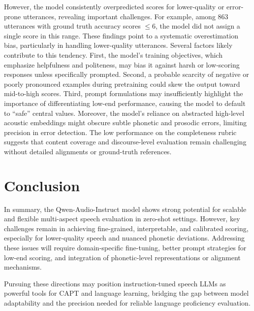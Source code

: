 \documentclass{Interspeech}
\begin{document}
However, the model consistently overpredicted scores for lower-quality or error-prone utterances, revealing important challenges. For example, among 863 utterances with ground truth accuracy scores  $\leq 6$, the model did not assign a single score in this range. These findings point to a systematic overestimation bias, particularly in handling lower-quality utterances. Several factors likely contribute to this tendency. First, the model’s training objectives, which emphasize helpfulness and politeness, may bias it against harsh or low-scoring responses unless specifically prompted. Second, a probable scarcity of negative or poorly pronounced examples during pretraining could skew the output toward mid-to-high scores. Third, prompt formulations may insufficiently highlight the importance of differentiating low-end performance, causing the model to default to “safe” central values. Moreover, the model’s reliance on abstracted high-level acoustic embeddings might obscure subtle phonetic and prosodic errors, limiting precision in error detection. The low performance on the completeness rubric suggests that content coverage and discourse-level evaluation remain challenging without detailed alignments or ground-truth references.

\section{Conclusion}

In summary, the Qwen-Audio-Instruct model shows strong potential for scalable and flexible multi-aspect speech evaluation in zero-shot settings. However, key challenges remain in achieving fine-grained, interpretable, and calibrated scoring, especially for lower-quality speech and nuanced phonetic deviations. Addressing these issues will require domain-specific fine-tuning, better prompt strategies for low-end scoring, and integration of phonetic-level representations or alignment mechanisms.

Pursuing these directions may position instruction-tuned speech LLMs as powerful tools for CAPT and language learning, bridging the gap between model adaptability and the precision needed for reliable language proficiency evaluation.



\end{document}

